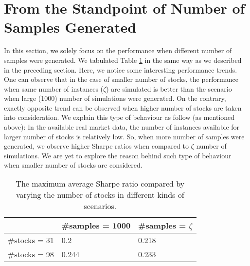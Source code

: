 \section{From the Standpoint of Number of Samples Generated}
In this section, we solely focus on the performance when different number of samples were generated. We tabulated Table \ref{tab:no_samples} in the same way as we described in the preceding section. Here, we notice some interesting performance trends. One can observe that in the case of smaller number of stocks, the performance when same number of instances ($\zeta$) are simulated is better than the scenario when large (1000) number of simulations were generated. On the contrary, exactly opposite trend can be observed when higher number of stocks are taken into consideration. We explain this type of behaviour as follow (as mentioned above): In the available real market data, the number of instances available for larger number of stocks is relatively low. So, when  more number of samples were generated, we observe higher Sharpe ratios when compared to $\zeta$ number of simulations. We are yet to explore the reason behind such type of behaviour when smaller number of stocks are considered.
\begin{table}[!h]
    \centering
    \captionsetup{justification=centering}
   \begin{tabular}{||p{4cm}|p{4cm}|p{4cm}||}
   \hline
  & \#samples = 1000 & \#samples = $\zeta$ \\
  \hline
  \#stocks = 31  & 0.2    &0.218\\
 \#stocks = 98 &   0.244  & 0.233 \\
 \hline
\end{tabular}
    \caption{The maximum average Sharpe ratio compared by varying the number of stocks in different kinds of scenarios.}
    \label{tab:no_samples}
\end{table}

